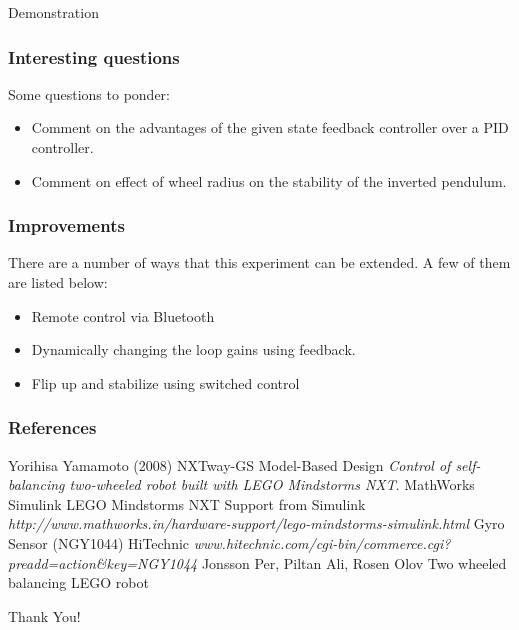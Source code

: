 \documentclass[aspectratio=169]{beamer}
\begin{document}

\begin{frame}
\Huge{\centerline{Demonstration}}
\end{frame}


\begin{frame}
\frametitle{Interesting questions}
Some questions to ponder:
\begin{itemize}
\item Comment on the advantages of the given state feedback controller over a PID controller.
\item Comment on effect of wheel radius on the stability of the inverted pendulum.
\end{itemize}
\end{frame}


\begin{frame}
\frametitle{Improvements}
There are a number of ways that this experiment can be extended. A few of them are listed below:
\begin{itemize}
\item Remote control via Bluetooth
\item Dynamically changing the loop gains using feedback.
\item Flip up and stabilize using switched control
\end{itemize}
\end{frame}


\begin{frame}
\frametitle{References}
\footnotesize{
\begin{thebibliography}{99} %
 Yorihisa Yamamoto (2008)
\newblock NXTway-GS Model-Based Design
\newblock \emph{Control of self-balancing two-wheeled robot built with LEGO Mindstorms NXT}.
 MathWorks Simulink
\newblock LEGO Mindstorms NXT Support from Simulink
\newblock \emph{http://www.mathworks.in/hardware-support/lego-mindstorms-simulink.html}
 Gyro Sensor (NGY1044)
\newblock HiTechnic
\newblock \emph{www.hitechnic.com/cgi-bin/commerce.cgi?preadd=action\&key=NGY1044}
 Jonsson Per, Piltan Ali, Rosen Olov
\newblock Two wheeled balancing LEGO robot

\end{thebibliography}
}
\end{frame}


\begin{frame}
\Huge{\centerline{Thank You!}}
\end{frame}

\end{document}
